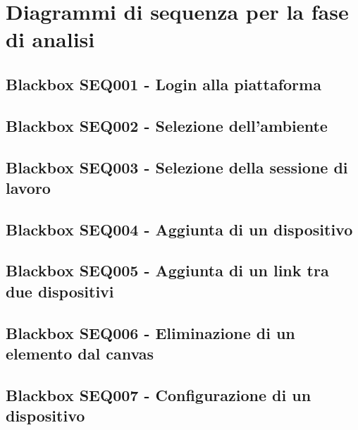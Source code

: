 \documentclass[../main.tex]{subfiles}
\begin{document}
\chapter{Diagrammi di sequenza per la fase di analisi}

\section{Blackbox SEQ001 - Login alla piattaforma }
\figure[H]
\centering

\endfigure
\vfill\newpage

\section{Blackbox SEQ002 - Selezione dell'ambiente }
\figure[H]
\centering

\endfigure
\vfill\newpage

\section{Blackbox SEQ003 - Selezione della sessione di lavoro }
\figure[H]
\centering

\endfigure
\vfill\newpage
\section{Blackbox SEQ004 - Aggiunta di un dispositivo }
\figure[H]
\centering

\endfigure
\vfill\newpage
\section{Blackbox SEQ005 - Aggiunta di un link tra due dispositivi }
\figure[H]
\centering

\endfigure
\vfill\newpage
\section{Blackbox SEQ006 - Eliminazione di un elemento dal canvas }
\figure[H]
\centering

\endfigure
\vfill\newpage
\section{Blackbox SEQ007 - Configurazione di un dispositivo }
\figure[H]
\centering

\endfigure
\vfill\newpage
\end{document}
